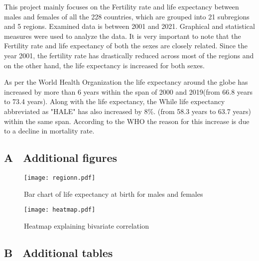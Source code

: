 \documentclass[12 pt]{scrartcl}
\begin{document}
	This project mainly focuses on the Fertility rate and life expectancy between males and females of all the 228 countries, which are grouped into 21 subregions and 5 regions. Examined data is between 2001 and 2021. Graphical and statistical measures were used to analyze the data. It is very important to note that the Fertility rate and life expectancy of both the sexes are closely related. Since the year 2001, the fertility rate has drastically reduced across most of the regions and on the other hand, the life expectancy is increased for both sexes.
	
	As per the World Health Organization the life expectancy around the globe has increased by more than 6 years within the span of 2000 and 2019(from 66.8 years to 73.4 years). Along with the life expectancy, the While life expectancy abbreviated as "HALE" has also increased by 8\%. (from 58.3 years to 63.7 years) within the same span. According to the WHO the reason for this increase is due to a decline in mortality rate. \cite{WHO}
	
	
	\newpage
	\renewcommand\refname{Bibliography} 
	
	
	
	\newpage
	\appendix 
	\subsection*{A \ Additional figures}
	
	\begin{figure}[h!]
		\centering
		\texttt{[image: regionn.pdf]}
		\caption{Bar chart of life expectancy at birth for males and females
		}
		\label{fig:regionbargraph}
	\end{figure}
	
	\begin{figure}[h!]
		\centering
		\texttt{[image: heatmap.pdf]}
		\caption{ Heatmap explaining bivariate correlation}
		\label{fig:scatterplots}
	\end{figure}
	
	\subsection*{B \ Additional tables}
	
\end{document}
